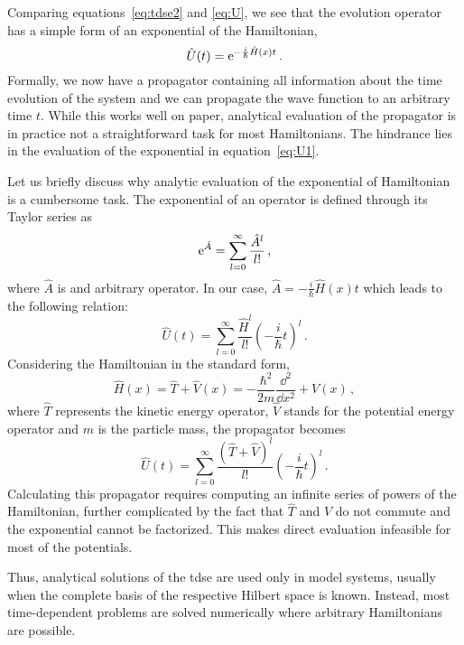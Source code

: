 Comparing equations~\eqref{eq:tdse2} and \eqref{eq:U}, we see that the evolution operator has a simple form of an exponential of the Hamiltonian,
\begin{equation}
    \hat{U}(t) = \mathrm{e}^{-\frac{i}{\hbar}\hat{H}(x)t} \, .
    \label{eq:U1}
\end{equation}
Formally, we now have a propagator containing all information about the time evolution of the system and we can propagate the wave function to an arbitrary time $t$. While this works well on paper, analytical evaluation of the propagator is in practice not a straightforward task for most Hamiltonians. The hindrance lies in the evaluation of the exponential in equation~\eqref{eq:U1}.

Let us briefly discuss why analytic evaluation of the exponential of Hamiltonian is a cumbersome task. The exponential of an operator is defined through its Taylor series as
\begin{equation}
    \mathrm{e}^{\hat{A}} = \sum_{l=0}^\infty \frac{\hat{A}^l}{l!} \, ,
\end{equation}
where $\hat{A}$ is and arbitrary operator. In our case, $\hat{A} = -\frac{i}{\hbar}\hat{H}(x)t$ which leads to the following relation:
\begin{equation}
    \hat{U}(t) = \sum_{l=0}^\infty \frac{\hat{H}^l}{l!} \left( -\frac{i}{\hbar} t\right)^l \, .
    \label{eq:U2}
\end{equation}
Considering the Hamiltonian in the standard form,
\begin{equation}
    \hat{H}(x) = \hat{T} + \hat{V}(x) = -\frac{\hbar^2}{2m}\frac{\dd^2}{\dd x^2} + V(x)\, ,
    \label{eq:Ham1}
\end{equation}
where $\hat{T}$ represents the kinetic energy operator, $\hat{V}$ stands for the potential energy operator and $m$ is the particle mass, the propagator becomes
\begin{equation}
    \hat{U}(t) = \sum_{l=0}^\infty \frac{(\hat{T}+\hat{V})^l}{l!} \left( -\frac{i}{\hbar} t\right)^l \, .
    \label{eq:U3}
\end{equation}
Calculating this propagator requires computing an infinite series of powers of the Hamiltonian, further complicated by the fact that $\hat{T}$ and $\hat{V}$ do not commute and the exponential cannot be factorized. This makes direct evaluation infeasible for most of the potentials.

Thus, analytical solutions of the \acrshort{tdse} are used only in model systems, usually when the complete basis of the respective Hilbert space is known. Instead, most time-dependent problems are solved numerically where arbitrary Hamiltonians are possible. 

